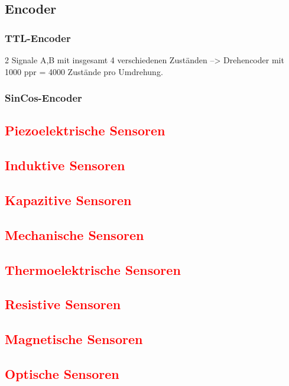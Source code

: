 		\subsection{Encoder}
			\subsubsection{TTL-Encoder}
				2 Signale A,B mit insgesamt 4 verschiedenen Zuständen --> Drehencoder mit 1000 ppr = 4000 Zustände pro Umdrehung.
			\subsubsection{SinCos-Encoder}
		\subsection{\textcolor{red}{Piezoelektrische Sensoren}}
		\subsection{\textcolor{red}{Induktive Sensoren}}
		\subsection{\textcolor{red}{Kapazitive Sensoren}}
		\subsection{\textcolor{red}{Mechanische Sensoren}}
		\subsection{\textcolor{red}{Thermoelektrische Sensoren}}
		\subsection{\textcolor{red}{Resistive Sensoren}}
		\subsection{\textcolor{red}{Magnetische Sensoren}}
		\subsection{\textcolor{red}{Optische Sensoren}}
